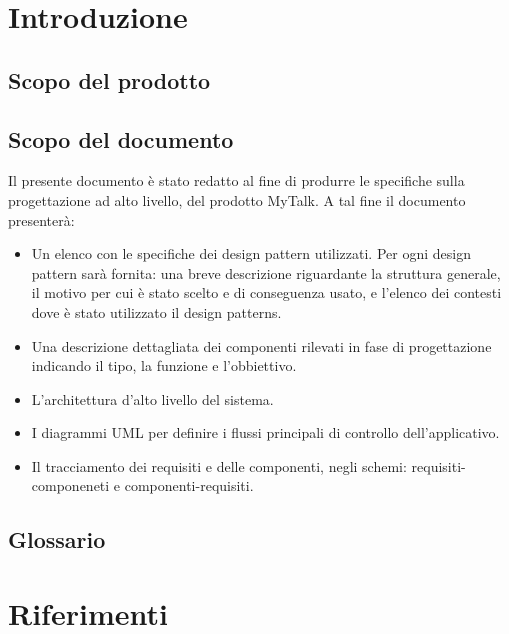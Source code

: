 

\setcounter{page}{1}
\pagestyle{normal}


\newpage

\section{Introduzione}
\subsection{Scopo del prodotto}
\purpose

\subsection{Scopo del documento}
Il presente documento è stato redatto al fine di produrre le specifiche sulla progettazione ad alto livello, del prodotto MyTalk. A tal fine il documento presenterà:

\begin{itemize}
	\item Un elenco con le specifiche dei design pattern utilizzati. Per ogni design pattern sarà fornita: una breve descrizione riguardante la struttura generale, il motivo per cui è stato scelto e di conseguenza usato, e l'elenco dei contesti dove è stato utilizzato il design patterns.
	\item Una descrizione dettagliata dei componenti rilevati in fase di progettazione indicando il tipo,
la funzione e l'obbiettivo.
	\item L'architettura d'alto livello del sistema.
	\item I diagrammi UML per definire i flussi principali di controllo dell'applicativo.
	\item Il tracciamento dei requisiti e delle componenti, negli schemi: requisiti-componeneti e componenti-requisiti.
\end{itemize}

\subsection{Glossario}
\glossaryIntro

\clearpage
\section{Riferimenti}

